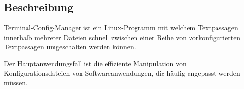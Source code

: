 \subsection{Beschreibung} \label{Beschreibung}
Terminal-Config-Manager ist ein Linux-Programm mit welchem
\gls{Textpassage}n innerhalb mehrerer Dateien schnell zwischen einer Reihe
von vorkonfigurierten \gls{Textpassage}n umgeschalten werden können.

Der Hauptanwendungsfall ist die effiziente  Manipulation von
Konfigurationsdateien von Softwareanwendungen, die häufig angepasst
werden müssen.